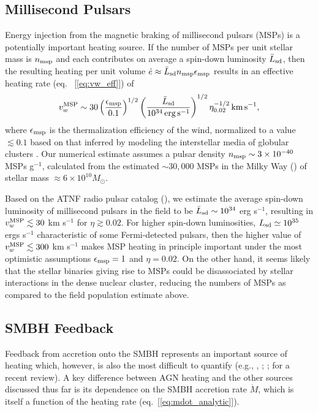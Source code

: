 \documentclass[usenatbib,fleqn]{mn2e}
\begin{document}
\subsection{Millisecond Pulsars}
 Energy injection from the magnetic braking of millisecond pulsars (MSPs) is a potentially
important heating source.  If the number of MSPs per unit stellar mass
is $n_{\rm msp}$ and each contributes on average a spin-down
luminosity $\bar{L}_{\rm sd}$, then the resulting heating per unit
volume $\dot{e} \approx \bar{L}_{\rm sd}n_{\rm msp}\epsilon_{\rm msp}$ results in an
effective heating rate (eq.~ [\ref{eq:vw_eff}]) of 
\begin{eqnarray} v_{w}^{\rm MSP} \sim
30\left(\frac{\epsilon_{\rm msp}}{0.1}\right)^{1/2}\left(\frac{\bar{L}_{\rm
sd}}{10^{34}\,{\rm erg\,s^{-1}}}\right)^{1/2} \eta_{0.02}^{-1/2}\,{\rm
km\,s^{-1}},
 \label{eq:vmsp}
  \end{eqnarray} 
where $\epsilon_{\rm msp}$ is the thermalization efficiency of
the wind, normalized to a value $\lesssim 0.1$ based on that inferred by modeling the interstellar media of globular clusters
\citep{NaimanSoares-Furtado+:2013a}.  Our numerical estimate assumes a
pulsar density $n_{\rm msp} \sim 3 \times 10^{-40} $ MSPs g$^{-1}$, calculated from the estimated $\sim 30,000$ MSPs in the Milky Way (\citealt{Lorimer13}) of stellar mass $\approx 6\times 10^{10}M_{\odot}$.

Based on the ATNF radio pulsar catalog (\citealt{Manchester+05}), we estimate the average spin-down luminosity of millisecond pulsars in the field to be $\bar{L}_{\rm sd} \sim 10^{34}$ erg s$^{-1}$, resulting in $v_{w}^{\rm MSP} \lesssim 30$ km s$^{-1}$ for $\eta \gtrsim 0.02$.  For higher spin-down
luminosities, $L_{\rm sd}\simeq 10^{35}$ ergs s$^{-1}$ characteristic
of some Fermi-detected pulsars, then the higher value of $v_{w}^{\rm MSP}
\lesssim 300$ km s$^{-1}$ makes MSP heating in principle important
under the most optimistic assumptions $\epsilon_{\rm msp} = 1$ and $\eta = 0.02$.  On the other hand, it seems likely that the stellar binaries giving rise to MSPs could be disassociated by stellar interactions in the dense nuclear cluster, reducing the numbers of MSPs as compared to the field population estimate above.  


\subsection{SMBH Feedback}

Feedback from accretion onto the SMBH represents an important source of heating which, however, is also the most difficult to quantify (e.g., \citealt{Brighenti&Mathews03}, \citealt{DiMatteo+05}; \citealt{Kurosawa&Proga09}; \citealt{Fabian12} for a recent review).  A key difference between AGN heating and the other sources discussed thus far is its dependence on the SMBH accretion rate $\dot{M}$, which is itself a function of the heating rate (eq.~[\ref{eq:mdot_analytic}]).  
\end{document}
